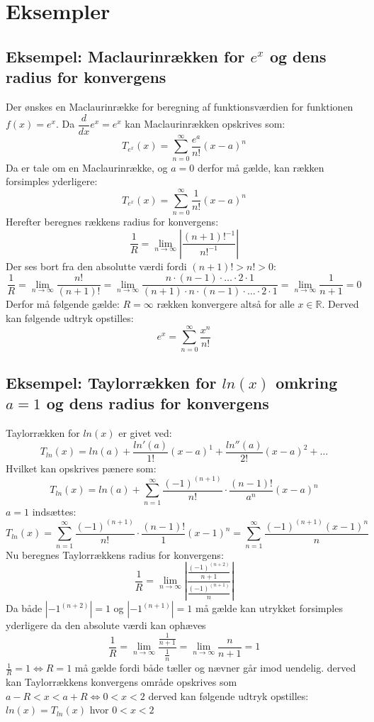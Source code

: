 \section{Eksempler}
\subsection*{\textbf{Eksempel:} Maclaurinrækken for $e^x$ og dens radius for konvergens} 
Der ønskes en Maclaurinrække for beregning af funktionsværdien for funktionen $f(x) = e^x$.
Da $\dfrac{d}{dx}e^x = e^x$ kan Maclaurinrækken opskrives som:
\[
    T_{e^x}(x) = \sum^\infty_{n = 0} \frac{e^a}{n!}(x-a)^n
\]
Da er tale om en Maclaurinrække, og $a = 0$ derfor må gælde, kan rækken forsimples yderligere:
\[
    T_{e^x}(x) = \sum^\infty_{n = 0} \frac{1}{n!}(x-a)^n
\]
Herefter beregnes rækkens radius for konvergens:
\[
    \frac{1}{R} = \lim_{n \rightarrow \infty} \left\lvert \frac{(n + 1)!^{-1}}{n!^{-1}} \right\lvert
\]
Der ses bort fra den absolutte værdi fordi $(n + 1)! > n! > 0$:
\[
    \frac{1}{R}= \lim_{n \rightarrow \infty} \frac{n!}{(n + 1)!} 
    = \lim_{n \rightarrow \infty} \frac{n \cdot (n-1) \cdot \ldots \cdot 2 \cdot 1}{(n + 1) \cdot n \cdot (n-1) \cdot \ldots \cdot 2 \cdot 1}
    = \lim_{n \rightarrow \infty} \frac{1}{n + 1} = 0
\]
Derfor må følgende gælde: $R = \infty$ rækken konvergere altså for alle $x \in \mathbb{R}$.
Derved kan følgende udtryk opstilles:
\[
    e^x = \sum^\infty_{n = 0} \frac{x^n}{n!}  
\]
\subsection*{\textbf{Eksempel:} Taylorrækken for $ln(x)$ omkring $a = 1$ og dens radius for konvergens} %
Taylorrækken for $ln(x)$ er givet ved:
\[
    T_{ln}(x) = ln(a) + \frac{ln'(a)}{1!}(x-a)^1 + \frac{ln''(a)}{2!}(x-a)^2 + \ldots
\]
Hvilket kan opskrives pænere som:
\[
    T_{ln}(x) = ln(a) + \sum^{\infty}_{n = 1} \frac{(-1)^{(n+1)}}{n!} \cdot \frac{(n-1)!}{a^n} (x-a)^{n}
\]
$a = 1$ indsættes:
\[
    T_{ln}(x) = \sum^{\infty}_{n = 1} \frac{(-1)^{(n+1)}}{n!} \cdot \frac{(n-1)!}{1} (x-1)^{n}
    = \sum^{\infty}_{n = 1} \frac{(-1)^{(n+1)}(x-1)^{n}}{n}
\]
Nu beregnes Taylorrækkens radius for konvergens: 
\[
    \frac{1}{R} = \lim_{n \rightarrow \infty} \left\lvert \frac{\frac{(-1)^{(n+2)}}{n+1}}{\frac{(-1)^{(n+1)}}{n}} \right\lvert
\]
Da både $\left\lvert -1^{(n+2)} \right\lvert = 1$ og $\left\lvert-1^{(n + 1)} \right\lvert = 1$ må gælde kan utrykket forsimples yderligere da den absolute værdi kan ophæves
\[
    \frac{1}{R} = \lim_{n \rightarrow \infty} \frac{\frac{1}{n+1}}{\frac{1}{n}} = \lim_{n \rightarrow \infty} \frac{n}{n+1} = 1
\]
$\frac{1}{R} = 1 \Leftrightarrow R = 1$ må gælde fordi både tæller og nævner går imod uendelig. 
derved kan Taylorrækkens konvergens område opskrives som $a-R < x < a+R \Leftrightarrow 0 < x < 2$ 
derved kan følgende udtryk opstilles: $ln(x) = T_{ln}(x)$ hvor $ 0 < x < 2$
